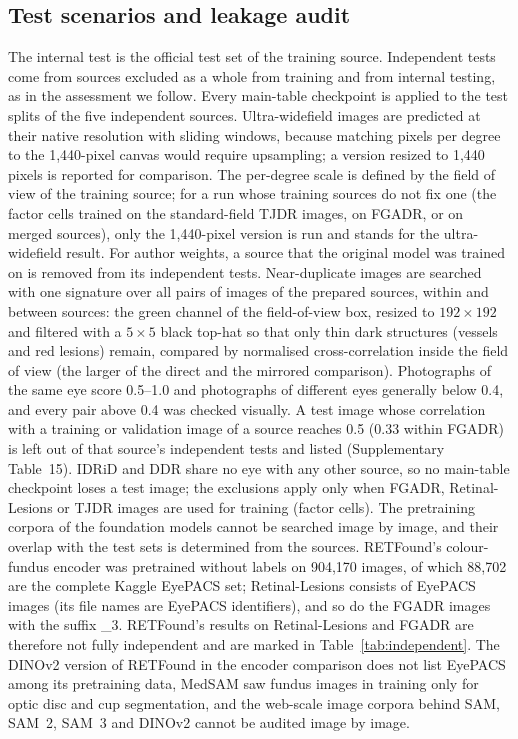 \subsection{Test scenarios and leakage audit}
The internal test is the official test set of the training source. Independent tests come from sources excluded as a whole from training and from internal testing, as in the assessment we follow\cite{lu2026tcrepitopenaturemethods}. Every main-table checkpoint is applied to the test splits of the five independent sources. Ultra-widefield images are predicted at their native resolution with sliding windows, because matching pixels per degree to the 1,440-pixel canvas would require upsampling; a version resized to 1,440 pixels is reported for comparison. The per-degree scale is defined by the field of view of the training source; for a run whose training sources do not fix one (the factor cells trained on the standard-field TJDR images, on FGADR, or on merged sources), only the 1,440-pixel version is run and stands for the ultra-widefield result. For author weights, a source that the original model was trained on is removed from its independent tests. Near-duplicate images are searched with one signature over all pairs of images of the prepared sources, within and between sources: the green channel of the field-of-view box, resized to $192\times192$ and filtered with a $5\times5$ black top-hat so that only thin dark structures (vessels and red lesions) remain, compared by normalised cross-correlation inside the field of view (the larger of the direct and the mirrored comparison). Photographs of the same eye score 0.5--1.0 and photographs of different eyes generally below 0.4, and every pair above 0.4 was checked visually. A test image whose correlation with a training or validation image of a source reaches 0.5 (0.33 within FGADR) is left out of that source's independent tests and listed (Supplementary Table~15). IDRiD and DDR share no eye with any other source, so no main-table checkpoint loses a test image; the exclusions apply only when FGADR, Retinal-Lesions or TJDR images are used for training (factor cells). The pretraining corpora of the foundation models cannot be searched image by image, and their overlap with the test sets is determined from the sources. RETFound's colour-fundus encoder\cite{zhou2023retfound} was pretrained without labels on 904,170 images, of which 88,702 are the complete Kaggle EyePACS set; Retinal-Lesions consists of EyePACS images (its file names are EyePACS identifiers), and so do the FGADR images with the suffix \_3. RETFound's results on Retinal-Lesions and FGADR are therefore not fully independent and are marked in Table~\ref{tab:independent}. The DINOv2 version of RETFound in the encoder comparison does not list EyePACS among its pretraining data, MedSAM saw fundus images in training only for optic disc and cup segmentation, and the web-scale image corpora behind SAM, SAM~2, SAM~3 and DINOv2 cannot be audited image by image.

